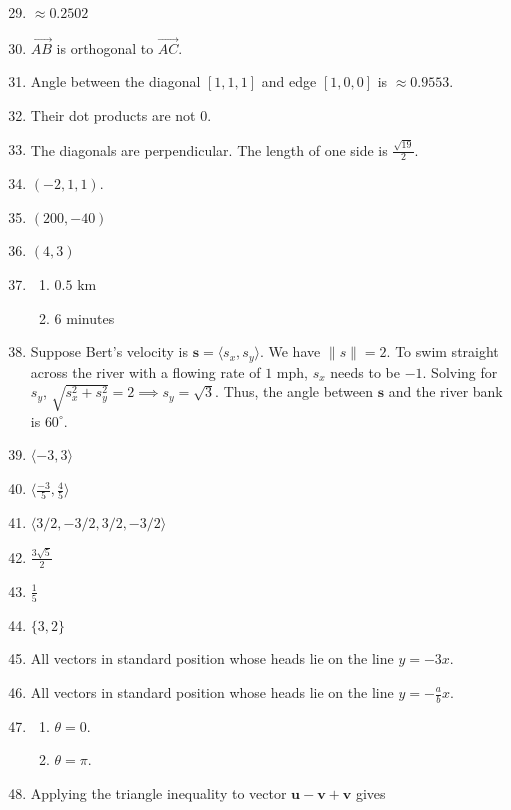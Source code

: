 \documentclass{article}
\newcommand{\vct}[1]{\langle #1 \rangle}
\newcommand{\vu}{\mathbf{u}}
\newcommand{\vv}{\mathbf{v}}
\begin{document}
\begin{enumerate}
    \setcounter{enumi}{28}
  \item $\approx0.2502$
    \setcounter{enumi}{30}
  \item $\overrightarrow{AB}$ is orthogonal to $\overrightarrow{AC}$.
  \item Angle between the diagonal $[1, 1, 1]$ and edge $[1, 0, 0]$ is $\approx0.9553$.
  \item Their dot products are not 0.
  \item The diagonals are perpendicular. The length of one side is $\frac{\sqrt{19}}{2}$.
  \item $(-2, 1, 1)$.
  \item $(200, -40)$
  \item $(4, 3)$
  \item
    \begin{enumerate}
      \item $0.5$ km
      \item 6 minutes
    \end{enumerate}
  \item Suppose Bert's velocity is $\mathbf{s}=\langle s_x, s_y \rangle$. We have
    $\|s\|=2$. To swim straight across the river with a flowing rate of $1$ mph, $s_x$
    needs to be $-1$. Solving for $s_y$, $\sqrt{s_x^2+s_y^2}=2 \implies s_y=\sqrt{3}$.
    Thus, the angle between $\mathbf{s}$ and the river bank is $60^\circ$.
  \item $\vct{-3, 3}$
  \item $\vct{\frac{-3}{5}, \frac{4}{5}}$
    \setcounter{enumi}{42}
  \item $\vct{3/2, -3/2, 3/2, -3/2}$
    \setcounter{enumi}{46}
  \item $\frac{3\sqrt{5}}{2}$
  \item $\frac{1}{5}$
  \item $\{3, 2\}$
  \item All vectors in standard position whose heads lie on the line $y=-3x$.
  \item All vectors in standard position whose heads lie on the line $y=-\frac{a}{b}x$.
  \item
    \begin{enumerate}
      \item $\theta=0$.
      \item $\theta=\pi$.
    \end{enumerate}
    \setcounter{enumi}{58}
  \item Applying the triangle inequality to vector $\vu-\vv+\vv$ gives
    \begin{align*}

\end{align*}
\end{enumerate}
\end{document}
